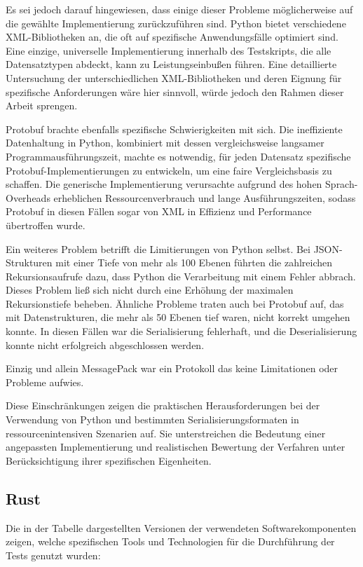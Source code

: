 \documentclass[ngerman]{seminarvorlage}
\begin{document}
Es sei jedoch darauf hingewiesen, dass einige dieser Probleme möglicherweise auf die gewählte Implementierung zurückzuführen sind. Python bietet verschiedene XML-Bibliotheken an, die oft auf spezifische Anwendungsfälle optimiert sind. Eine einzige, universelle Implementierung innerhalb des Testskripts, die alle Datensatztypen abdeckt, kann zu Leistungseinbußen führen. Eine detaillierte Untersuchung der unterschiedlichen XML-Bibliotheken und deren Eignung für spezifische Anforderungen wäre hier sinnvoll, würde jedoch den Rahmen dieser Arbeit sprengen.

Protobuf brachte ebenfalls spezifische Schwierigkeiten mit sich. Die ineffiziente Datenhaltung in Python, kombiniert mit dessen vergleichsweise langsamer Programmausführungszeit, machte es notwendig, für jeden Datensatz spezifische Protobuf-Implementierungen zu entwickeln, um eine faire Vergleichsbasis zu schaffen. Die generische Implementierung verursachte aufgrund des hohen Sprach-Overheads erheblichen Ressourcenverbrauch und lange Ausführungszeiten, sodass Protobuf in diesen Fällen sogar von XML in Effizienz und Performance übertroffen wurde.

Ein weiteres Problem betrifft die Limitierungen von Python selbst. Bei JSON-Strukturen mit einer Tiefe von mehr als 100 Ebenen führten die zahlreichen Rekursionsaufrufe dazu, dass Python die Verarbeitung mit einem Fehler abbrach. Dieses Problem ließ sich nicht durch eine Erhöhung der maximalen Rekursionstiefe beheben. Ähnliche Probleme traten auch bei Protobuf auf, das mit Datenstrukturen, die mehr als 50 Ebenen tief waren, nicht korrekt umgehen konnte. In diesen Fällen war die Serialisierung fehlerhaft, und die Deserialisierung konnte nicht erfolgreich abgeschlossen werden.

Einzig und allein MessagePack war ein Protokoll das keine Limitationen oder Probleme aufwies.

Diese Einschränkungen zeigen die praktischen Herausforderungen bei der Verwendung von Python und bestimmten Serialisierungsformaten in ressourcenintensiven Szenarien auf. Sie unterstreichen die Bedeutung einer angepassten Implementierung und realistischen Bewertung der Verfahren unter Berücksichtigung ihrer spezifischen Eigenheiten.

\subsection{Rust}

Die in der Tabelle dargestellten Versionen der verwendeten Softwarekomponenten zeigen, welche spezifischen Tools und Technologien für die Durchführung der Tests genutzt wurden:
\end{document}
